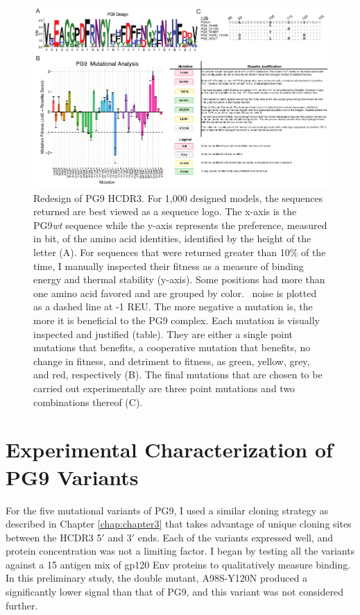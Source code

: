 \begin{figure}[!t]
   \centering
   \includegraphics[scale=1.5,width=.99\textwidth]{images/chapter4/figure4_3.pdf} %
   \caption[Redesign of PG9 HCDR3]{Redesign of PG9 HCDR3. For 1,000 designed models, the sequences returned are best viewed as a sequence logo. The x-axis is the PG9\textit{wt} sequence while the y-axis represents the preference, measured in bit, of the amino acid identities, identified by the height of the letter (A). For sequences that were returned greater than 10\% of the time, I manually inspected their fitness as a measure of binding energy and thermal stability (y-axis). Some positions had more than one amino acid favored and are grouped by color. \rosetta~noise is plotted as a dashed line at -1 REU. The more negative a mutation is, the more it is beneficial to the PG9 complex. Each mutation is visually inspected and justified (table). They are either a single point mutations that benefits, a cooperative mutation that benefits, no change in fitness, and detriment to fitness, as green, yellow, grey, and red, respectively (B). The final mutations that are chosen to be carried out experimentally are three point mutations and two combinations thereof (C).}
   \label{fig:figure4_3}
\end{figure}


\section{Experimental Characterization of PG9 Variants}
For the five mutational variants of PG9, I used a similar cloning strategy as described in Chapter \ref{chap:chapter3} that takes advantage of unique cloning sites between the HCDR3 5$'$ and 3$'$ ends. Each of the variants expressed well, and protein concentration was not a limiting factor. I began by testing all the variants against a 15 antigen mix of gp120 Env proteins to qualitatively measure binding. In this preliminary study, the double mutant, A98S-Y120N produced a significantly lower signal than that of PG9, and this variant was not considered further.

